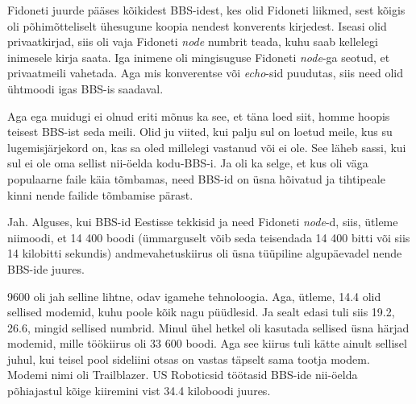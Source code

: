 
Fidoneti juurde pääses kõikidest BBS-idest, kes olid Fidoneti liikmed, sest 
kõigis oli põhimõtteliselt ühesugune koopia nendest konverents kirjedest. 
Iseasi olid privaatkirjad, siis oli  vaja Fidoneti \emph{node} numbrit teada, 
kuhu saab kellelegi inimesele kirja saata. Iga inimene oli  mingisuguse 
Fidoneti \emph{node}-ga seotud, et  privaatmeili vahetada. Aga mis konverentse 
või \emph{echo}-sid puudutas,  siis need  olid ühtmoodi igas BBS-is  saadaval.

Aga ega muidugi ei olnud eriti mõnus ka see, et täna loed siit, homme  hoopis 
teisest BBS-ist seda meili. Olid ju viited, kui palju sul on loetud meile, kus 
su lugemisjärjekord on, kas sa oled millelegi vastanud või ei ole. See  läheb 
sassi, kui sul ei ole oma sellist nii-öelda kodu-BBS-i. Ja oli ka selge, et kus 
oli väga populaarne faile käia tõmbamas,  need BBS-id on  üsna hõivatud ja 
tihtipeale kinni nende failide tõmbamise pärast. 


Jah. Alguses, kui BBS-id Eestisse tekkisid ja need Fidoneti \emph{node}-d, 
siis, ütleme niimoodi, et 14 400 boodi (ümmarguselt võib seda teisendada 14 400 
bitti või siis 14 kilobitti sekundis) andmevahetuskiirus oli üsna tüüpiline  
algupäevadel nende BBS-ide juures.


9600 oli jah selline lihtne, odav igamehe tehnoloogia. Aga, ütleme, 14.4 olid 
sellised modemid, kuhu poole kõik nagu püüdlesid. Ja sealt edasi tuli siis 
19.2, 26.6, mingid sellised numbrid. Minul ühel hetkel oli kasutada sellised 
üsna  härjad modemid, mille töökiirus oli 33 600 boodi. Aga see kiirus tuli 
kätte ainult sellisel juhul, kui teisel pool sideliini otsas on vastas täpselt 
sama tootja modem. Modemi  nimi oli Trailblazer. US Roboticsid  töötasid BBS-ide 
nii-öelda  põhiajastul kõige kiiremini vist 34.4 kiloboodi juures.


